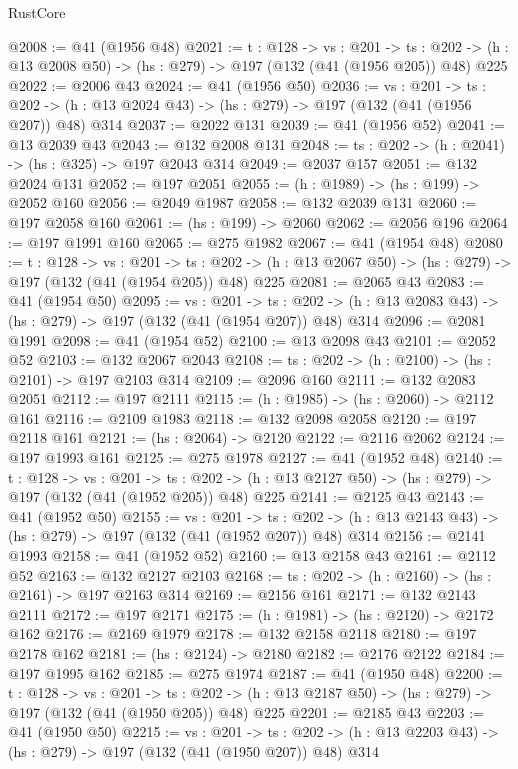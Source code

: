 \begin{lexlean}{RustCore}
\begin{coremodule}
@2008 := @41 (@1956 @48)
@2021 := {t : @128} ->
  {vs : @201} ->
  {ts : @202} -> (h : @13 @2008 @50) -> (hs : @279) -> @197 (@132 (@41 (@1956 @205)) @48) @225
@2022 := @2006 @43
@2024 := @41 (@1956 @50)
@2036 := {vs : @201} ->
  {ts : @202} -> (h : @13 @2024 @43) -> (hs : @279) -> @197 (@132 (@41 (@1956 @207)) @48) @314
@2037 := @2022 @131
@2039 := @41 (@1956 @52)
@2041 := @13 @2039 @43
@2043 := @132 @2008 @131
@2048 := {ts : @202} -> (h : @2041) -> (hs : @325) -> @197 @2043 @314
@2049 := @2037 @157
@2051 := @132 @2024 @131
@2052 := @197 @2051
@2055 := (h : @1989) -> (hs : @199) -> @2052 @160
@2056 := @2049 @1987
@2058 := @132 @2039 @131
@2060 := @197 @2058 @160
@2061 := (hs : @199) -> @2060
@2062 := @2056 @196
@2064 := @197 @1991 @160
@2065 := @275 @1982
@2067 := @41 (@1954 @48)
@2080 := {t : @128} ->
  {vs : @201} ->
  {ts : @202} -> (h : @13 @2067 @50) -> (hs : @279) -> @197 (@132 (@41 (@1954 @205)) @48) @225
@2081 := @2065 @43
@2083 := @41 (@1954 @50)
@2095 := {vs : @201} ->
  {ts : @202} -> (h : @13 @2083 @43) -> (hs : @279) -> @197 (@132 (@41 (@1954 @207)) @48) @314
@2096 := @2081 @1991
@2098 := @41 (@1954 @52)
@2100 := @13 @2098 @43
@2101 := @2052 @52
@2103 := @132 @2067 @2043
@2108 := {ts : @202} -> (h : @2100) -> (hs : @2101) -> @197 @2103 @314
@2109 := @2096 @160
@2111 := @132 @2083 @2051
@2112 := @197 @2111
@2115 := (h : @1985) -> (hs : @2060) -> @2112 @161
@2116 := @2109 @1983
@2118 := @132 @2098 @2058
@2120 := @197 @2118 @161
@2121 := (hs : @2064) -> @2120
@2122 := @2116 @2062
@2124 := @197 @1993 @161
@2125 := @275 @1978
@2127 := @41 (@1952 @48)
@2140 := {t : @128} ->
  {vs : @201} ->
  {ts : @202} -> (h : @13 @2127 @50) -> (hs : @279) -> @197 (@132 (@41 (@1952 @205)) @48) @225
@2141 := @2125 @43
@2143 := @41 (@1952 @50)
@2155 := {vs : @201} ->
  {ts : @202} -> (h : @13 @2143 @43) -> (hs : @279) -> @197 (@132 (@41 (@1952 @207)) @48) @314
@2156 := @2141 @1993
@2158 := @41 (@1952 @52)
@2160 := @13 @2158 @43
@2161 := @2112 @52
@2163 := @132 @2127 @2103
@2168 := {ts : @202} -> (h : @2160) -> (hs : @2161) -> @197 @2163 @314
@2169 := @2156 @161
@2171 := @132 @2143 @2111
@2172 := @197 @2171
@2175 := (h : @1981) -> (hs : @2120) -> @2172 @162
@2176 := @2169 @1979
@2178 := @132 @2158 @2118
@2180 := @197 @2178 @162
@2181 := (hs : @2124) -> @2180
@2182 := @2176 @2122
@2184 := @197 @1995 @162
@2185 := @275 @1974
@2187 := @41 (@1950 @48)
@2200 := {t : @128} ->
  {vs : @201} ->
  {ts : @202} -> (h : @13 @2187 @50) -> (hs : @279) -> @197 (@132 (@41 (@1950 @205)) @48) @225
@2201 := @2185 @43
@2203 := @41 (@1950 @50)
@2215 := {vs : @201} ->
  {ts : @202} -> (h : @13 @2203 @43) -> (hs : @279) -> @197 (@132 (@41 (@1950 @207)) @48) @314

\end{coremodule}
\end{lexlean}
